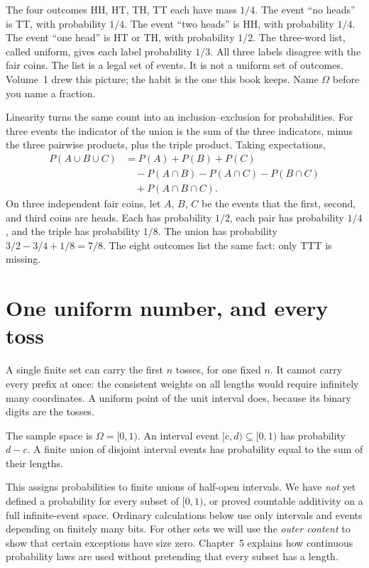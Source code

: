 The four outcomes HH, HT, TH, TT each have mass $1/4$. The event ``no heads'' is TT, with probability $1/4$. The event ``two heads'' is HH, with probability $1/4$. The event ``one head'' is HT or TH, with probability $1/2$. The three-word list, called uniform, gives each label probability $1/3$. All three labels disagree with the fair coins. The list is a legal set of events. It is not a uniform set of outcomes. Volume~1 drew this picture; the habit is the one this book keeps. Name $\Omega$ before you name a fraction.

Linearity turns the same count into an inclusion--exclusion for probabilities. For three events the indicator of the union is the sum of the three indicators, minus the three pairwise products, plus the triple product. Taking expectations,
\begin{align*}
 P(A\cup B\cup C)
 &=P(A)+P(B)+P(C)\\
 &\quad -P(A\cap B)-P(A\cap C)-P(B\cap C)\\
 &\quad +P(A\cap B\cap C).
\end{align*}
On three independent fair coins, let $A$, $B$, $C$ be the events that the first, second, and third coins are heads. Each has probability $1/2$, each pair has probability $1/4$, and the triple has probability $1/8$. The union has probability $3/2-3/4+1/8=7/8$. The eight outcomes list the same fact: only TTT is missing.

\section{One uniform number, and every toss}

A single finite set can carry the first $n$ tosses, for one fixed $n$. It cannot carry every prefix at once: the consistent weights on all lengths would require infinitely many coordinates. A uniform point of the unit interval does, because its binary digits are the tosses.

\begin{definition}\label{def:uniform}
The sample space is $\Omega=[0,1)$. An interval event $[c,d)\subseteq[0,1)$ has probability $d-c$. A finite union of disjoint interval events has probability equal to the sum of their lengths.
\end{definition}

This assigns probabilities to finite unions of half-open intervals. We have \emph{not} yet defined a probability for every subset of $[0,1)$, or proved countable additivity on a full infinite-event space. Ordinary calculations below use only intervals and events depending on finitely many bits. For other sets we will use the \emph{outer content} to show that certain exceptions have size zero. Chapter~5 explains how continuous probability laws are used without pretending that every subset has a length.

